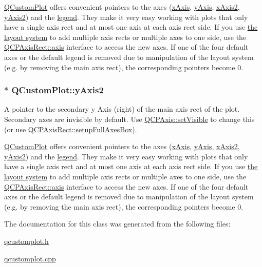 \hyperlink{classQCustomPlot}{Q\+Custom\+Plot} offers convenient pointers to the axes (\hyperlink{classQCustomPlot_a9a79cd0158a4c7f30cbc702f0fd800e4}{x\+Axis}, \hyperlink{classQCustomPlot_af6fea5679725b152c14facd920b19367}{y\+Axis}, \hyperlink{classQCustomPlot_ada41599f22cad901c030f3dcbdd82fd9}{x\+Axis2}, \hyperlink{classQCustomPlot_af13fdc5bce7d0fabd640f13ba805c0b7}{y\+Axis2}) and the \hyperlink{classQCustomPlot_a4eadcd237dc6a09938b68b16877fa6af}{legend}. They make it very easy working with plots that only have a single axis rect and at most one axis at each axis rect side. If you use \hyperlink{}{the layout system} to add multiple axis rects or multiple axes to one side, use the \hyperlink{classQCPAxisRect_a560de44e47a4af0f86c59102a094b1e4}{Q\+C\+P\+Axis\+Rect\+::axis} interface to access the new axes. If one of the four default axes or the default legend is removed due to manipulation of the layout system (e.\+g. by removing the main axis rect), the corresponding pointers become 0. 
\subsubsection[{\texorpdfstring{y\+Axis2}{yAxis2}}]{ $\ast$ Q\+Custom\+Plot\+::y\+Axis2}\hypertarget{classQCustomPlot_af13fdc5bce7d0fabd640f13ba805c0b7}{}\label{classQCustomPlot_af13fdc5bce7d0fabd640f13ba805c0b7}
A pointer to the secondary y Axis (right) of the main axis rect of the plot. Secondary axes are invisible by default. Use \hyperlink{classQCPLayerable_a3bed99ddc396b48ce3ebfdc0418744f8}{Q\+C\+P\+Axis\+::set\+Visible} to change this (or use \hyperlink{classQCPAxisRect_a5fa906175447b14206954f77fc7f1ef4}{Q\+C\+P\+Axis\+Rect\+::setup\+Full\+Axes\+Box}).

\hyperlink{classQCustomPlot}{Q\+Custom\+Plot} offers convenient pointers to the axes (\hyperlink{classQCustomPlot_a9a79cd0158a4c7f30cbc702f0fd800e4}{x\+Axis}, \hyperlink{classQCustomPlot_af6fea5679725b152c14facd920b19367}{y\+Axis}, \hyperlink{classQCustomPlot_ada41599f22cad901c030f3dcbdd82fd9}{x\+Axis2}, \hyperlink{classQCustomPlot_af13fdc5bce7d0fabd640f13ba805c0b7}{y\+Axis2}) and the \hyperlink{classQCustomPlot_a4eadcd237dc6a09938b68b16877fa6af}{legend}. They make it very easy working with plots that only have a single axis rect and at most one axis at each axis rect side. If you use \hyperlink{}{the layout system} to add multiple axis rects or multiple axes to one side, use the \hyperlink{classQCPAxisRect_a560de44e47a4af0f86c59102a094b1e4}{Q\+C\+P\+Axis\+Rect\+::axis} interface to access the new axes. If one of the four default axes or the default legend is removed due to manipulation of the layout system (e.\+g. by removing the main axis rect), the corresponding pointers become 0. 

The documentation for this class was generated from the following files\+:\begin{DoxyCompactItemize}
\item 
\hyperlink{qcustomplot_8h}{qcustomplot.\+h}\item 
\hyperlink{qcustomplot_8cpp}{qcustomplot.\+cpp}\end{DoxyCompactItemize}
